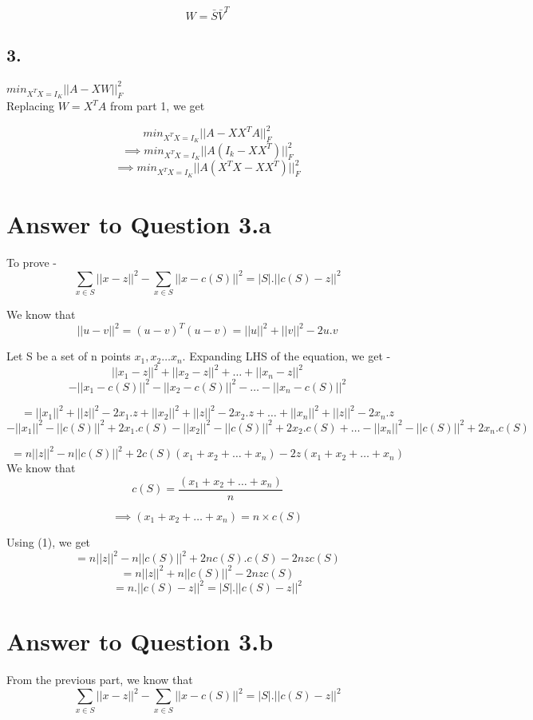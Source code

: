 \documentclass[11pt]{article}
\begin{document}
{$$W = \bar{S}\bar{V}^T$$

\subsection*{3.}
$min_{X^TX = I_K} ||A-XW||_F^2$\\

Replacing $W = X^T A$ from part 1, we get

$$min_{X^TX = I_K} ||A-XX^T A||_F^2$$
$$ \implies min_{X^TX = I_K} ||A (I_k-XX^T)||_F^2$$
$$ \implies min_{X^TX = I_K} ||A (X^TX-XX^T)||_F^2$$

\pagebreak[4]
\section*{Answer to Question 3.a}
To prove -
$$\sum_{x \in S} || x - z ||^2 - \sum_{x \in S} || x - c(S)||^2 = |S| . || c(S) - z ||^2$$

We know that 
$$||u - v||^2 = (u - v)^T (u - v) = ||u||^2 + ||v||^2 - 2u.v$$

Let S be a set of n points $x_1, x_2 \hdots x_n$. Expanding LHS of the equation, we get -
$$ || x_1 - z ||^2 + || x_2 - z ||^2 + \hdots + || x_n - z ||^2$$ 
$$- || x_1 - c(S)||^2 - || x_2 - c(S)||^2 - \hdots - || x_n - c(S)||^2$$

$$ = ||x_1||^2 + ||z||^2 - 2x_1.z + ||x_2||^2 + ||z||^2 - 2x_2.z + \hdots + ||x_n||^2 + ||z||^2 - 2x_n.z$$
$$ - ||x_1||^2 - ||c(S)||^2 + 2x_1.c(S) - ||x_2||^2 - ||c(S)||^2 + 2x_2.c(S) + \hdots - ||x_n||^2 - ||c(S)||^2 + 2x_n.c(S)$$

$$ = n ||z||^2 - n ||c(S)||^2 + 2 c(S) (x_1 + x_2 + \hdots + x_n) - 2 z (x_1 + x_2 + \hdots + x_n)$$
We know that
$$c(S) = \frac{(x_1 + x_2 + \hdots + x_n)}{n}$$

\setcounter{equation}{0}
\begin{equation}
\implies  (x_1 + x_2 + \hdots + x_n) = n \times c(S)
\end{equation} 

Using (1), we get
$$ = n ||z||^2 - n ||c(S)||^2 + 2 n c(S).c(S)  - 2 n z c(S)$$
$$ = n ||z||^2 + n ||c(S)||^2 - 2 n z c(S)$$
$$ =  n . || c(S) - z ||^2 = |S| . || c(S) - z ||^2$$


\pagebreak[4]
\section*{Answer to Question 3.b}
From the previous part, we know that $$\sum_{x \in S} || x - z ||^2 - \sum_{x \in S} || x - c(S)||^2 = |S| . || c(S) - z ||^2$$

}
\end{document}
